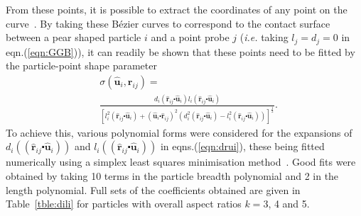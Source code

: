 \documentclass[%
reprint,
superscriptaddress,
showpacs,
 amsmath,amssymb,
 aps,
floatfix,
]{revtex4-1}
\newcommand{\vect}[1]{ \mathbf{#1} }
\newcommand{\vecth}[1]{ \mathbf{\hat{#1} } }
\newcommand{\lp}{\left(}
\newcommand{\rp}{\right)}
\newcommand{\rij}{\vecth{r}_{ij}}
\newcommand{\ui}{\vecth{u}_i}
\newcommand{\dotProdP}[2]{ \left( #1 \centerdot #2 \right) }
\newcommand{\dotProd}[2]{ #1 \centerdot #2 }
\newcommand{\sir}{\sigma(\ui,\vect{r}_{ij})}
\begin{document}
From these points, it is possible to extract the coordinates of any point on the
curve~\cite{graphicsMaths}. By taking these B\'{e}zier curves to correspond to the contact
surface between a pear shaped particle $i$ and a point probe $j$ ({\em i.e.} taking $l_j=d_j=0$
in eqn.(\ref{eqn:GGB})), it can readily be shown that these points need to be fitted by the
particle-point shape parameter
\begin{equation}
\begin{split}
    &\sir =\\
    &\frac{d_i(\dotProd{\rij}{\ui})l_i(\dotProd{\rij}{\ui})}
    {\left[l_i^2(\dotProd{\rij}{\ui}) +
    \lp\dotProd{\ui}{\rij}\rp^2\lp d_i^2(\dotProd{\rij}{\ui})- l_i^2(\dotProd{\rij}{\ui})
    \rp\right]^{\frac{1}{2}}}.
    \label{eqn:GBP_sir}
\end{split}
\end{equation}
To achieve this, various polynomial forms were considered for the expansions of
$d_i(\dotProdP{\rij}{\ui})$ and $l_i(\dotProdP{\rij}{\ui})$ in eqns.(\ref{eqn:drui}), these
being fitted numerically using a simplex least squares minimisation
method~\cite{Numerical_Recipes}. Good fits were obtained by taking 10 terms in the particle
breadth polynomial and 2 in the length polynomial. Full sets of the coefficients obtained are
given in Table~\ref{tble:dili} for particles with overall aspect ratios $k=3$, 4 and 5.
\end{document}
